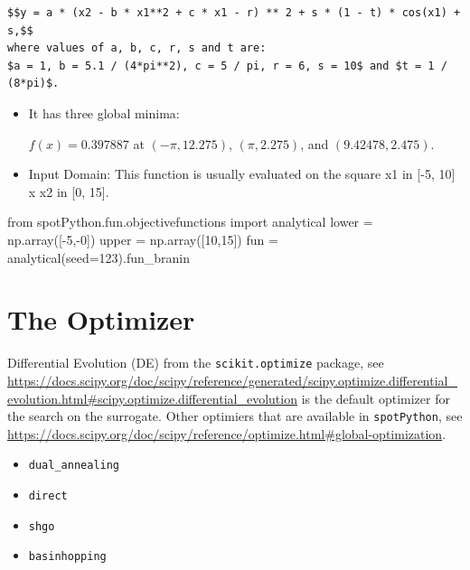 \documentclass[
  letterpaper,
  DIV=11,
  numbers=noendperiod]{scrreprt}
\newenvironment{Shaded}{\begin{snugshade}}{\end{snugshade}}
\newcommand{\DecValTok}[1]{\textcolor[rgb]{0.68,0.00,0.00}{#1}}
\newcommand{\ImportTok}[1]{\textcolor[rgb]{0.00,0.46,0.62}{#1}}
\newcommand{\NormalTok}[1]{\textcolor[rgb]{0.00,0.23,0.31}{#1}}
\newcommand{\OperatorTok}[1]{\textcolor[rgb]{0.37,0.37,0.37}{#1}}
\providecommand{\tightlist}{%
  \setlength{\itemsep}{0pt}\setlength{\parskip}{0pt}}\usepackage{longtable,booktabs,array}
\begin{document}
\begin{verbatim}
$$y = a * (x2 - b * x1**2 + c * x1 - r) ** 2 + s * (1 - t) * cos(x1) + s,$$ 
where values of a, b, c, r, s and t are: 
$a = 1, b = 5.1 / (4*pi**2), c = 5 / pi, r = 6, s = 10$ and $t = 1 / (8*pi)$.
\end{verbatim}

\begin{itemize}
\item
  It has three global minima:

  \(f(x) = 0.397887\) at \((-\pi, 12.275)\), \((\pi, 2.275)\), and
  \((9.42478, 2.475)\).
\item
  Input Domain: This function is usually evaluated on the square x1 in
  {[}-5, 10{]} x x2 in {[}0, 15{]}.
\end{itemize}

\begin{Shaded}
\begin{Highlighting}[]
\ImportTok{from}\NormalTok{ spotPython.fun.objectivefunctions }\ImportTok{import}\NormalTok{ analytical}
\NormalTok{lower }\OperatorTok{=}\NormalTok{ np.array([}\OperatorTok{{-}}\DecValTok{5}\NormalTok{,}\OperatorTok{{-}}\DecValTok{0}\NormalTok{])}
\NormalTok{upper }\OperatorTok{=}\NormalTok{ np.array([}\DecValTok{10}\NormalTok{,}\DecValTok{15}\NormalTok{])}
\NormalTok{fun }\OperatorTok{=}\NormalTok{ analytical(seed}\OperatorTok{=}\DecValTok{123}\NormalTok{).fun\_branin}
\end{Highlighting}
\end{Shaded}

\section{The Optimizer}\label{the-optimizer}

Differential Evolution (DE) from the \texttt{scikit.optimize} package,
see
\url{https://docs.scipy.org/doc/scipy/reference/generated/scipy.optimize.differential_evolution.html\#scipy.optimize.differential_evolution}
is the default optimizer for the search on the surrogate. Other
optimiers that are available in \texttt{spotPython}, see
\url{https://docs.scipy.org/doc/scipy/reference/optimize.html\#global-optimization}.

\begin{itemize}
\tightlist
\item
  \texttt{dual\_annealing}
\item
  \texttt{direct}
\item
  \texttt{shgo}
\item
  \texttt{basinhopping}
\end{itemize}
\end{document}
